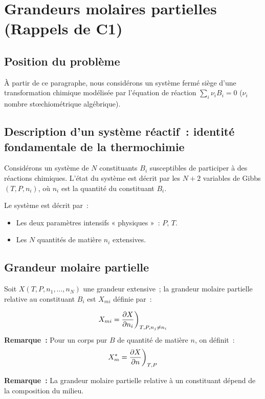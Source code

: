 \documentclass{article}
\begin{document}
\section{Grandeurs molaires partielles (Rappels de C1)}
\subsection{Position du problème}
À partir de ce paragraphe, nous considérons un système fermé siège d'une transformation chimique modélisée par l'équation de réaction  $\displaystyle\sum_i \nu_i B_i = 0$ ($\nu_i$ nombre stœchiométrique algébrique).

\subsection{Description d'un système réactif~: identité fondamentale de la thermochimie}
Considérons un système de $N$ constituants $B_i$ susceptibles de participer à des réactions chimiques. L'état du système est décrit par les $N+2$ variables de Gibbs $(T,P,n_i)$, où $n_i$ est la quantité du constituant $B_i$.

\begin{tableau}
    Le système est décrit par~:
    \begin{itemize}
        \item Les deux paramètres intensifs « physiques »~: $P,\,T$.
        \item Les $N$ quantités de matière $n_i$ extensives.
    \end{itemize}
\end{tableau}

\subsection{Grandeur molaire partielle}
Soit $X(T,P,n_1, . . . ,n_N)$ une grandeur extensive~; la grandeur molaire partielle relative au constituant $B_i$ est $X_{mi}$ définie par~:
\begin{tableau}
$$X_{mi}=\pdv{X}{n_i}\bigg)_{T,P,n_j\neq n_i}$$
\textbf{Remarque~:} Pour un corps pur\footnotemark{} $B$ de quantité de matière $n$, on définit~:
$$X_m^* = \pdv{X}{n}\bigg)_{T,P}$$
\end{tableau}
\textbf{Remarque~:} La grandeur molaire partielle relative à un constituant dépend de la composition du milieu.
\end{document}
